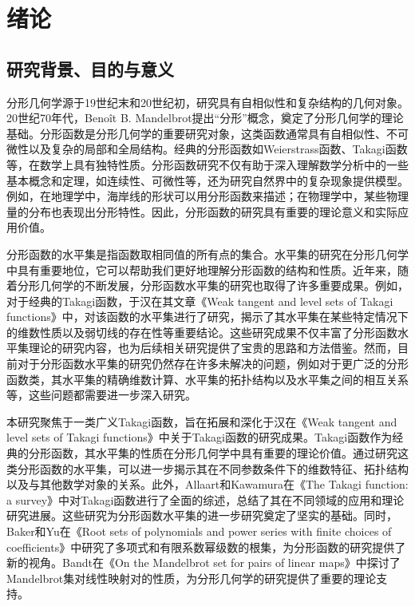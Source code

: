 \cleardoublepage
\section{绪论}

\subsection{研究背景、目的与意义}

分形几何学源于19世纪末和20世纪初，研究具有自相似性和复杂结构的几何对象。20世纪70年代，Benoît B. Mandelbrot提出“分形”概念，奠定了分形几何学的理论基础。分形函数是分形几何学的重要研究对象，这类函数通常具有自相似性、不可微性以及复杂的局部和全局结构。经典的分形函数如Weierstrass函数、Takagi函数等，在数学上具有独特性质。分形函数研究不仅有助于深入理解数学分析中的一些基本概念和定理，如连续性、可微性等，还为研究自然界中的复杂现象提供模型。例如，在地理学中，海岸线的形状可以用分形函数来描述；在物理学中，某些物理量的分布也表现出分形特性。因此，分形函数的研究具有重要的理论意义和实际应用价值。

分形函数的水平集是指函数取相同值的所有点的集合。水平集的研究在分形几何学中具有重要地位，它可以帮助我们更好地理解分形函数的结构和性质。近年来，随着分形几何学的不断发展，分形函数水平集的研究也取得了许多重要成果。例如，对于经典的Takagi函数，于汉在其文章《Weak tangent and level sets of Takagi functions》\cite{10}中，对该函数的水平集进行了研究，揭示了其水平集在某些特定情况下的维数性质以及弱切线的存在性等重要结论。这些研究成果不仅丰富了分形函数水平集理论的研究内容，也为后续相关研究提供了宝贵的思路和方法借鉴。然而，目前对于分形函数水平集的研究仍然存在许多未解决的问题，例如对于更广泛的分形函数类，其水平集的精确维数计算、水平集的拓扑结构以及水平集之间的相互关系等，这些问题都需要进一步深入研究。

本研究聚焦于一类广义Takagi函数，旨在拓展和深化于汉在《Weak tangent and level sets of Takagi functions》中关于Takagi函数的研究成果。Takagi函数作为经典的分形函数，其水平集的性质在分形几何学中具有重要的理论价值。通过研究这类分形函数的水平集，可以进一步揭示其在不同参数条件下的维数特征、拓扑结构以及与其他数学对象的关系。此外，Allaart和Kawamura在《The Takagi function: a survey》\cite{1}中对Takagi函数进行了全面的综述，总结了其在不同领域的应用和理论研究进展。这些研究为分形函数水平集的进一步研究奠定了坚实的基础。同时，Baker和Yu在《Root sets of polynomials and power series with finite choices of coefficients》\cite{2}中研究了多项式和有限系数幂级数的根集，为分形函数的研究提供了新的视角。Bandt在《On the Mandelbrot set for pairs of linear maps》\cite{3}中探讨了Mandelbrot集对线性映射对的性质，为分形几何学的研究提供了重要的理论支持。

